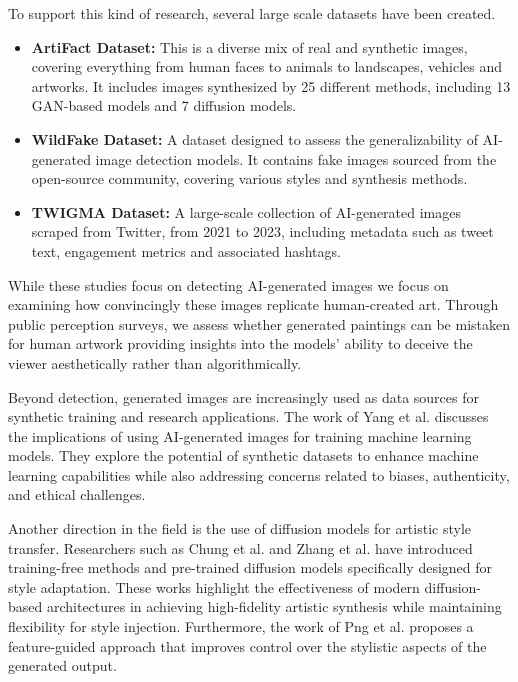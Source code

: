 To support this kind of research, several large scale datasets have been created.
\begin{itemize}
    \item \textbf{ArtiFact Dataset:}\cite{artifact_dataset} This is a diverse mix of real and synthetic images, covering everything from human faces to animals to landscapes, vehicles and artworks. It includes images synthesized by 25 different methods, including 13 GAN-based models and 7 diffusion models.
    \item \textbf{WildFake Dataset:}\cite{wildfake_dataset} A dataset designed to assess the generalizability of AI-generated image detection models. It contains fake images sourced from the open-source community, covering various styles and synthesis methods.
    \item \textbf{TWIGMA Dataset:}\cite{twigma_dataset} A large-scale collection of AI-generated images scraped from Twitter, from 2021 to 2023, including metadata such as tweet text, engagement metrics and associated hashtags.
\end{itemize}
While these studies focus on detecting AI-generated images we focus on examining how convincingly these images replicate human-created art. Through public perception surveys, we assess whether generated paintings can be mistaken for human artwork providing insights into the models' ability to deceive the viewer aesthetically rather than algorithmically. 

Beyond detection, generated images are increasingly used as data sources for synthetic training and research applications. The work of Yang et al. \cite{aigen}
discusses the implications of using AI-generated images for training machine learning models. They explore the potential of synthetic datasets to enhance machine learning capabilities while also addressing concerns related to biases, authenticity, and ethical challenges.

Another direction in the field is the use of diffusion models for artistic style transfer. Researchers such as Chung et al. \cite{Style_injection} and Zhang et al. \cite{Step-aware} \cite{ArtBank} have introduced training-free methods and pre-trained diffusion models specifically designed for style adaptation. These works highlight the effectiveness of modern diffusion-based architectures in achieving high-fidelity artistic synthesis while maintaining flexibility for style injection. Furthermore, the work of Png et al. \cite{FeaST} proposes a feature-guided approach that improves control over the stylistic aspects of the generated output. 

